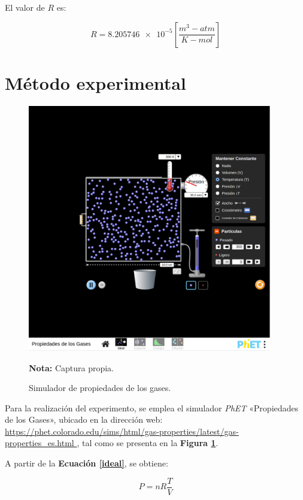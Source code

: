 \documentclass[letter,11pt]{article}
\newcommand{\source}[1]{\vspace{-11pt} \caption*{\small{\textbf{Nota:} {#1}}}}
\begin{document}
El valor de $R$ es:

\begin{equation*}
    R = \num{8.205746e-5} \left[\frac{m^3-atm}{K-mol}\right]
\end{equation*}
\vspace{0.10cm}

\section{Método experimental}

\begin{figure}
\centering
\includegraphics[width=0.95\textwidth]{resources/f2.eps}
\caption{Simulador de propiedades de los gases.}
\label{figura2}
\source{Captura propia.}
\end{figure}

Para la realización del experimento, se emplea el simulador \emph{PhET}
«Propiedades de los Gases», ubicado en la dirección web: \url{
https://phet.colorado.edu/sims/html/gas-properties/latest/gas-properties_es.html
}, tal como se presenta en la \textbf{Figura \ref{figura2}}.

A partir de la \textbf{Ecuación \ref{ideal}}, se obtiene:

\begin{equation*}
    P = nR\frac{T}{V}
\end{equation*}
\end{document}
